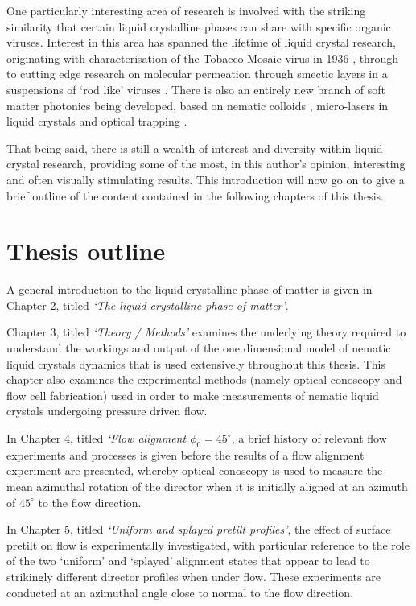 One particularly interesting area of research is involved with the striking similarity that certain liquid crystalline phases can share with specific organic viruses. Interest in this area has spanned the lifetime of liquid crystal research, originating with characterisation of the Tobacco Mosaic virus in 1936 \cite{Bawden1936}, through to cutting edge research on molecular permeation through smectic layers in a suspensions of `rod like' viruses \cite{Lettinga2007,Tkachenko1996, Helfrich1969}. There is also an entirely new branch of soft matter photonics being developed, based on nematic colloids \cite{Yablonovitch1987}, micro-lasers in liquid crystals \cite{Humar2010,Schafer2008,Doane1986} and optical trapping \cite{Smalyukh2005,Yada2004}.
 
That being said, there is still a wealth of interest and diversity within liquid crystal research, providing some of the most, in this author's opinion, interesting and often visually stimulating results. This introduction will now go on to give a brief outline of the content contained in the following chapters of this thesis.

\section{Thesis outline}
A general introduction to the liquid crystalline phase of matter is given in Chapter 2, titled \textit{`The liquid crystalline phase of matter'}.
 
Chapter 3, titled \textit{`Theory / Methods'} examines the underlying theory required to understand the workings and output of the one dimensional model of nematic liquid crystals dynamics that is used extensively throughout this thesis. This chapter also examines the experimental methods (namely optical conoscopy and flow cell fabrication) used in order to make measurements of nematic liquid crystals undergoing pressure driven flow.
 
In Chapter 4, titled \textit{`Flow alignment $\phi_0=45^{\circ}$}, a brief history of relevant flow experiments and processes is given before the results of a flow alignment experiment are presented, whereby optical conoscopy is used to measure the mean azimuthal rotation of the director when it is initially aligned at an azimuth of $45^{\circ}$ to the flow direction.

In Chapter 5, titled \textit{`Uniform and splayed pretilt profiles'}, the effect of surface pretilt on flow is experimentally investigated, with particular reference to the role of the two `uniform' and `splayed' alignment states that appear to lead to strikingly different director profiles when under flow. These experiments are conducted at an azimuthal angle close to normal to the flow direction.
 
